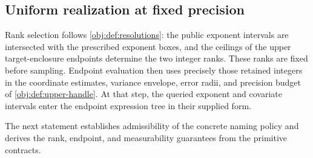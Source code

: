 \documentclass[11pt]{article}
\begin{document}
\subsection{Uniform realization at fixed precision}

Rank selection follows \cref{obj:def:resolutions}: the public exponent intervals are intersected with the prescribed exponent boxes, and the ceilings of the upper target-enclosure endpoints determine the two integer ranks. These ranks are fixed before sampling. Endpoint evaluation then uses precisely those retained integers in the coordinate estimates, variance envelope, error radii, and precision budget of \cref{obj:def:upper-handle}. At that step, the queried exponent and covariate intervals enter the endpoint expression tree in their supplied form.

The next statement establishes admissibility of the concrete naming policy and derives the rank, endpoint, and measurability guarantees from the primitive contracts.
\end{document}
